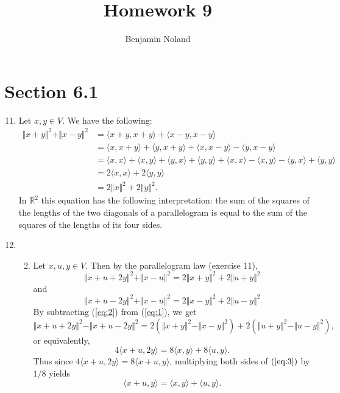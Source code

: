 \documentclass[12pt]{article}
\title{Homework 9}
\author{Benjamin Noland}
\date{}
\begin{document}
\maketitle

\section*{Section 6.1}

\begin{enumerate}
\setcounter{enumi}{10}
\item
Let $x, y \in V$. We have the following:
\begin{align*}
\Vert x + y \Vert^2 + \Vert x - y \Vert^2 &= \langle x + y, x + y \rangle + \langle x - y, x - y \rangle \\
&= \langle x, x + y \rangle + \langle y, x + y \rangle + \langle x, x - y \rangle - \langle y, x - y \rangle \\
&= \langle x, x \rangle + \langle x, y \rangle + \langle y, x \rangle + \langle y, y \rangle + \langle x, x \rangle - \langle x, y \rangle - \langle y, x \rangle + \langle y, y \rangle \\
&= 2\langle x, x \rangle + 2\langle y, y \rangle \\
&= 2\Vert x \Vert^2 + 2\Vert y \Vert^2.
\end{align*}
In $\mathbb{R}^2$ this equation has the following interpretation: the sum of the squares of the lengths of the two diagonals of a parallelogram is equal to the sum of the squares of the lengths of its four sides.

\setcounter{enumi}{26}
\item
\begin{enumerate}
\setcounter{enumii}{1}
\item
Let $x, u, y \in V$. Then by the parallelogram law (exercise 11),
\begin{equation} \label{eq:1}
\Vert x + u + 2y \Vert^2 + \Vert x - u \Vert^2 = 2\Vert x + y \Vert^2 + 2\Vert u + y \Vert^2
\end{equation}
and
\begin{equation} \label{eq:2}
\Vert x + u - 2y \Vert^2 + \Vert x - u \Vert^2 = 2\Vert x - y \Vert^2 + 2\Vert u - y \Vert^2
\end{equation}
By subtracting (\ref{eq:2}) from (\ref{eq:1}), we get
\begin{equation*}
\Vert x + u + 2y \Vert^2 - \Vert x + u - 2y \Vert^2 = 2(\Vert x + y \Vert^2 - \Vert x - y \Vert^2) + 2(\Vert u + y \Vert^2 - \Vert u - y \Vert^2),
\end{equation*}
or equivalently,
\begin{equation} \label{eq:3}
4 \langle x + u, 2y \rangle = 8\langle x, y \rangle + 8\langle u, y \rangle.
\end{equation}
Thus since $4 \langle x + u, 2y \rangle = 8 \langle x + u, y \rangle$, multiplying both sides of $(\ref{eq:3})$ by $1/8$ yields
\begin{equation*}
\langle x + u, y \rangle = \langle x, y \rangle + \langle u, y \rangle.
\end{equation*}


\end{enumerate}
\end{enumerate}
\end{document}
